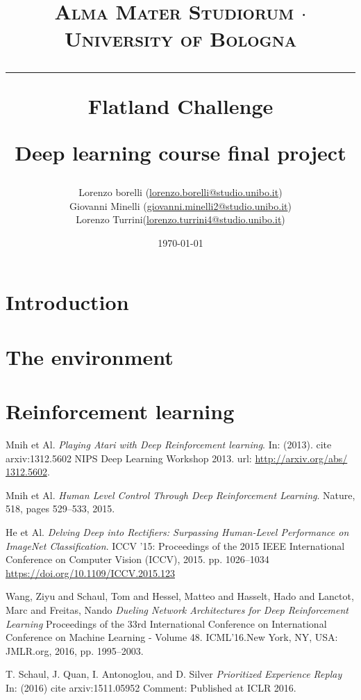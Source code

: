 \documentclass[a4paper,14pt]{extreport}
\begin{document}
\title{
	{{\large{\textsc{Alma Mater Studiorum $\cdot$ University of Bologna}}}}
	\rule{\textwidth}{0.4pt}\vspace{3mm}
	\textbf{Flatland Challenge}
	
	Deep learning course final project
}

\author{Lorenzo borelli (\href{mailto:lorenzo.borelli@studio.unibo.it}{lorenzo.borelli@studio.unibo.it}) 
\\ Giovanni Minelli (\href{mailto:giovanni.minelli2@studio.unibo.it}{giovanni.minelli2@studio.unibo.it}) 
\\ Lorenzo Turrini(\href{mailto:lorenzo.turrini4@studio.unibo.it}{lorenzo.turrini4@studio.unibo.it})}
\date{\today}
\maketitle
\newpage
\tableofcontents
\listoffigures
\listoftables
\newpage

\chapter{Introduction}


\chapter{The environment}



\chapter{Reinforcement learning}


\begin{thebibliography}{9}

	
	Mnih et Al.
	\textit{Playing Atari with Deep Reinforcement learning}. 
	In: (2013). cite arxiv:1312.5602 
	NIPS Deep Learning Workshop 2013. url: \url{http://arxiv.org/abs/
	1312.5602}.
	
	Mnih et Al.
	\textit{Human Level Control Through Deep Reinforcement Learning}. 
	Nature, 518, pages 529–533, 2015.

	He et Al.
	\textit{Delving Deep into Rectifiers: Surpassing Human-Level Performance on ImageNet Classification}. 
	 ICCV '15: Proceedings of the 2015 IEEE International Conference on Computer Vision (ICCV), 2015.
	 pp. 1026–1034 \url{https://doi.org/10.1109/ICCV.2015.123}
	 
	 Wang, Ziyu and Schaul, Tom and Hessel, Matteo and Hasselt, Hado and Lanctot, Marc and Freitas, Nando
	 \textit{Dueling Network Architectures for Deep Reinforcement Learning}
	 Proceedings of the 33rd International Conference on International Conference on Machine Learning - Volume 48.
	 ICML’16.New York, NY, USA: JMLR.org, 2016, pp. 1995–2003.
	 
	 T. Schaul, J. Quan, I. Antonoglou, and D. Silver
	 \textit{Prioritized Experience Replay}
	 In: (2016) cite arxiv:1511.05952
	 Comment: Published at ICLR 2016.

\end{thebibliography}
\end{document}
